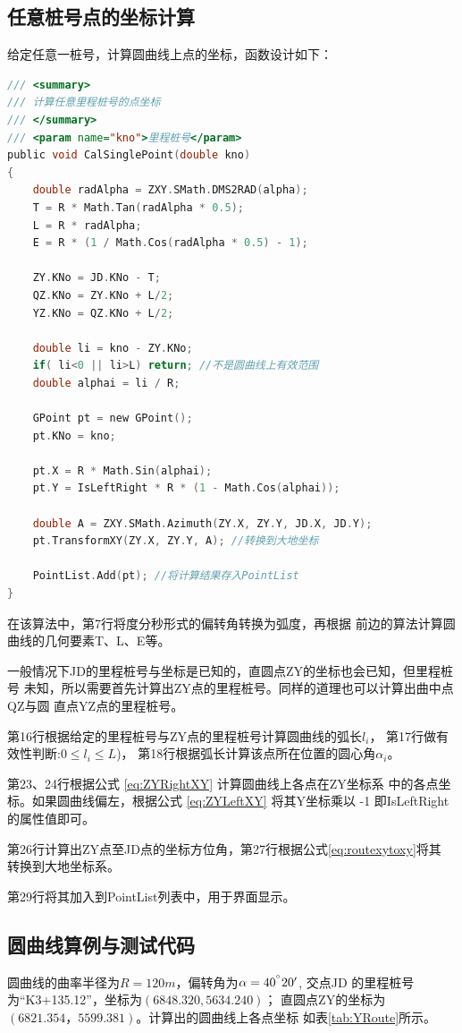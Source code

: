 \subsection{ 任意桩号点的坐标计算 }

给定任意一桩号，计算圆曲线上点的坐标，函数设计如下：
\begin{lstlisting}[language=C]
/// <summary>
/// 计算任意里程桩号的点坐标
/// </summary>
/// <param name="kno">里程桩号</param>
public void CalSinglePoint(double kno)
{
    double radAlpha = ZXY.SMath.DMS2RAD(alpha);
    T = R * Math.Tan(radAlpha * 0.5);
    L = R * radAlpha;
    E = R * (1 / Math.Cos(radAlpha * 0.5) - 1);

    ZY.KNo = JD.KNo - T;
    QZ.KNo = ZY.KNo + L/2;
    YZ.KNo = QZ.KNo + L/2;

    double li = kno - ZY.KNo;
    if( li<0 || li>L) return; //不是圆曲线上有效范围
    double alphai = li / R;

    GPoint pt = new GPoint();
    pt.KNo = kno;

    pt.X = R * Math.Sin(alphai);
    pt.Y = IsLeftRight * R * (1 - Math.Cos(alphai));

    double A = ZXY.SMath.Azimuth(ZY.X, ZY.Y, JD.X, JD.Y);
    pt.TransformXY(ZY.X, ZY.Y, A); //转换到大地坐标

    PointList.Add(pt); //将计算结果存入PointList
}
\end{lstlisting}

在该算法中，第7行将度分秒形式的偏转角转换为弧度，再根据
前边的算法计算圆曲线的几何要素T、L、E等。

一般情况下JD的里程桩号与坐标是已知的，直圆点ZY的坐标也会已知，但里程桩号
未知，所以需要首先计算出ZY点的里程桩号。同样的道理也可以计算出曲中点QZ与圆
直点YZ点的里程桩号。

第16行根据给定的里程桩号与ZY点的里程桩号计算圆曲线的弧长$l_i$，
第17行做有效性判断:$0 \le l_i \le L$)，
第18行根据弧长计算该点所在位置的圆心角$\alpha_i$。

第23、24行根据公式 \ref{eq:ZYRightXY} 计算圆曲线上各点在ZY坐标系
中的各点坐标。如果圆曲线偏左，根据公式 \ref{eq:ZYLeftXY} 将其Y坐标乘以
-1 即IsLeftRight的属性值即可。

第26行计算出ZY点至JD点的坐标方位角，第27行根据公式\ref{eq:routexytoxy}将其
转换到大地坐标系。

第29行将其加入到PointList列表中，用于界面显示。

\subsection{圆曲线算例与测试代码}
圆曲线的曲率半径为$R=120m$，偏转角为$\alpha=40^{^\circ}20'$, 交点JD
的里程桩号为``K3+135.12''，坐标为$(6848.320, 5634.240)$；
直圆点ZY的坐标为$(6821.354，5599.381)$。计算出的圆曲线上各点坐标
如表\ref{tab:YRoute}所示。

